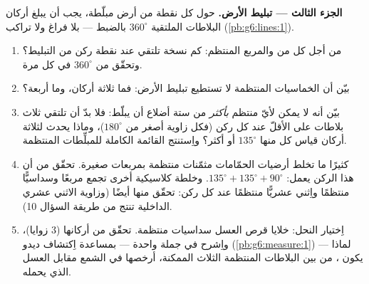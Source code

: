 \begin{problem}
\medskip
\noindent\textbf{الجزء الثالث --- تبليط الأرض.}
حول كل نقطة من أرض مبلّطة، يجب أن يبلغ  أركان
البلاطات الملتقية $360^\circ$ بالضبط --- بلا فراغ ولا تراكب
(\cref{pb:g6:lines:1}).
\begin{enumerate}[resume]
  \item من أجل كل من  والمربع 
        المنتظم: كم نسخة تلتقي عند نقطة ركن
        من التبليط؟ وتحقّق من $360^\circ$ في كل مرة.
  \item بيّن أن الخماسيات المنتظمة لا تستطيع تبليط الأرض: فما
         ثلاثة أركان، وما  أربعة؟
  \item بيّن أنه لا يمكن لأيّ  منتظم \emph{بأكثر} من ستة
        أضلاع أن يبلّط: فلا بدّ أن تلتقي ثلاث بلاطات على الأقلّ عند كل
        ركن (فكل زاوية أصغر من $180^\circ$)، وماذا
        يحدث لثلاثة أركان قياس كل منها $135^\circ$ أو أكثر؟ واِستنتج
        القائمة الكاملة للمبلِّطات المنتظمة.
  \item كثيرًا ما تخلط أرضيات الحمّامات مثمّنات منتظمة بمربعات
        صغيرة. تحقّق من أن هذا الركن يعمل:
        $135^\circ + 135^\circ + 90^\circ$. وخلطة كلاسيكية أخرى تجمع
        مربعًا وسداسيًّا منتظمًا واِثني عشريًّا منتظمًا عند
        كل ركن: تحقّق منها أيضًا (وزاوية الاثني عشري
        الداخلية تنتج من طريقة السؤال 10).
  \item اِختيار النحل: خلايا قرص العسل سداسيات منتظمة.
        تحقّق من أركانها ($3$ زوايا)، واِشرح في جملة
        واحدة --- بمساعدة اِكتشاف ديدو
        (\cref{pb:g6:measure:1}) --- لماذا يكون ، من بين البلاطات
        المنتظمة الثلاث الممكنة، أرخصها في الشمع مقابل
        العسل الذي يحمله.
\end{enumerate}
\end{problem}
